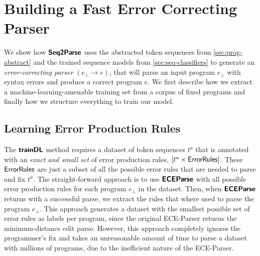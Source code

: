 \section{Building a Fast Error Correcting Parser}
\label{sec:whole-system}

We show how $\bm{\mathsf{Seq2Parse}}$ uses the abstracted token sequences from
\autoref{sec:prog-abstract} and the trained sequence models from
\autoref{sec:seq-classifiers} to generate an \emph{error-correcting parser}
$(e_{\bot} \to e)$, that will parse an input program $e_{\bot}$ with syntax
errors and produce a correct program $e$. We first describe how we extract a
machine-learning-amenable training set from a corpus of fixed programs and
finally how we structure everything to train our model.


\subsection{Learning Error Production Rules}
\label{sec:whole-system:error-rules}

The $\bm{\mathsf{trainDL}}$ method requires a dataset of token sequences $t^a$ that is
annotated with an \emph{exact and small set} of error production rules, \ie
$[t^a \times \mathsf{ErrorRules}]$. These $\mathsf{ErrorRules}$ are just a subset of
all the possible error rules that are needed to parse and fix $t^a$. The
straight-forward approach is to use $\bm{\mathsf{ECEParse}}$ with all possible error
production rules for each program $e_{\bot}$ in the dataset. Then, when
$\bm{\mathsf{ECEParse}}$ returns with a successful parse, we extract the rules that where used
to parse the program $e_{\bot}$. This approach generates a dataset with the
smallest possible set of error rules as labels per program, since the original
ECE-Parser returns the minimum-distance edit parse. However, this approach
completely ignores the programmer's fix and takes an unreasonable amount of time
to parse a dataset with millions of programs, due to the inefficient nature of
the ECE-Parser.

